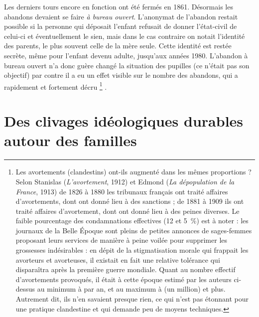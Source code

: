  Les derniers tours encore en fonction ont été fermés en 1861. Désormais les abandons devaient se faire \emph{à bureau ouvert}. L'anonymat de l'abandon restait possible si la personne qui déposait l'enfant refusait de donner l'état-civil de celui-ci et éventuellement le sien, mais dans le cas contraire on notait l'identité des parents, le plus souvent celle de la mère seule. Cette identité est restée secrète, même pour l'enfant devenu adulte, jusqu'aux années 1980. L'abandon à bureau ouvert n'a donc guère changé la situation des pupilles (ce n'était pas son objectif) par contre il a eu un effet visible sur le nombre des abandons, qui a rapidement et fortement décru%
\footnote{Les avortements (clandestins) ont-ils augmenté dans les mêmes proportions ? Selon Stanislas  (\emph{L'avortement}, 1912) et Edmond  (\emph{La dépopulation de la France}, 1913) de 1826 à 1880 les tribunaux français ont traité  affaires d'avortements, dont  ont donné lieu à des sanctions ; de 1881 à 1909 ils ont traité  affaires d'avortement, dont  ont donné lieu à des peines diverses. Le faible pourcentage des condamnations effectives (12 et 5~\%) est à noter : les journaux de la Belle Époque sont pleins de petites annonces de sages-femmes proposant leurs services de manière à peine voilée pour supprimer les grossesses indésirables : en dépit de la stigmatisation morale qui frappait les avorteurs et avorteuses, il existait en fait une relative tolérance qui disparaîtra après la première guerre mondiale. Quant au nombre effectif d'avortements provoqués, il était à cette époque estimé par les auteurs ci-dessus au minimum à  par an, et au maximum à  (un million) et plus. Autrement dit, ils n'en savaient presque rien, ce qui n'est pas étonnant pour une pratique clandestine et qui demande peu de moyens techniques.}%
.


\section{Des clivages idéologiques durables autour des familles}

